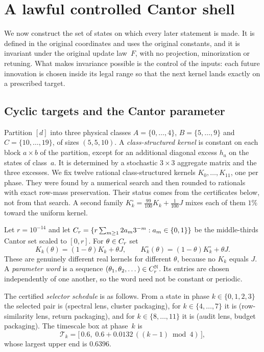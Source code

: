 \section{A lawful controlled Cantor shell}\label{sec:shell}

We now construct the set of states on which every later statement is made. It is defined in the original coordinates and uses the original constants, and it is invariant under the original update law~$F$, with no projection, minorization or retuning. What makes invariance possible is the control of the inputs: each future innovation is chosen inside its legal range so that the next kernel lands exactly on a prescribed target.

\subsection{Cyclic targets and the Cantor parameter}

Partition $[d]$ into three physical classes $A=\{0,\dots,4\}$, $B=\{5,\dots,9\}$ and $C=\{10,\dots,19\}$, of sizes $(5,5,10)$. A \emph{class-structured kernel} is constant on each block $a\times b$ of the partition, except for an additional diagonal excess $h_a$ on the states of class~$a$. It is determined by a stochastic $3\times 3$ aggregate matrix and the three excesses. We fix twelve rational class-structured kernels $K_0,\dots,K_{11}$, one per phase. They were found by a numerical search and then rounded to rationals with exact row-mass preservation. Their status comes from the certificates below, not from that search. A second family $K^{\circ}_k=\tfrac{99}{100}K_k+\tfrac{1}{100}J$ mixes each of them $1\%$ toward the uniform kernel.

Let $r=10^{-14}$ and let $C_r=\{r\sum_{m\ge1}2a_m3^{-m}:a_m\in\{0,1\}\}$ be the middle-thirds Cantor set scaled to $[0,r]$. For $\theta\in C_r$ set
\[
K_k(\theta)=(1-\theta)K_k+\theta J,\qquad K^{\circ}_k(\theta)=(1-\theta)K^{\circ}_k+\theta J.
\]
These are genuinely different real kernels for different $\theta$, because no $K_k$ equals $J$. A \emph{parameter word} is a sequence $(\theta_1,\theta_2,\dots)\in C_r^{\mathbb{N}}$. Its entries are chosen independently of one another, so the word need not be constant or periodic.

The certified \emph{selector schedule} is as follows. From a state in phase $k\in\{0,1,2,3\}$ the selected pair is (spectral lens, cluster packaging), for $k\in\{4,\dots,7\}$ it is (row-similarity lens, return packaging), and for $k\in\{8,\dots,11\}$ it is (audit lens, budget packaging). The timescale box at phase~$k$ is
\[
\mathcal{T}_k=\bigl[\,0.6,\;0.6+0.0132\,((k-1)\bmod 4)\,\bigr],
\]
whose largest upper end is $0.6396$.

